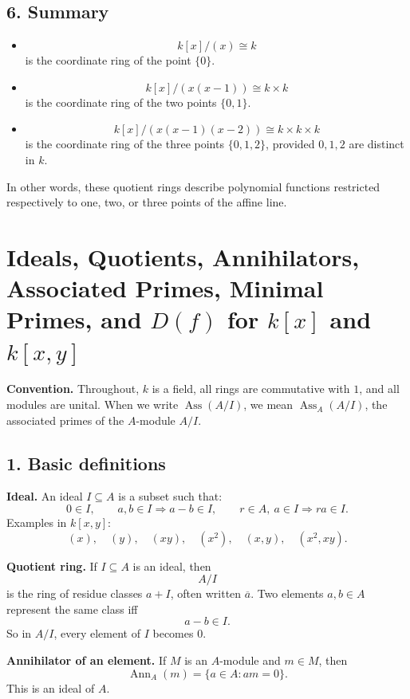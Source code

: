 \documentclass[12pt,a4paper]{article}
\theoremstyle{notespace}
\DeclareMathOperator{\Ass}{Ass}
\DeclareMathOperator{\Ann}{Ann}
\begin{document}
\subsection{6. Summary}

\begin{itemize}
	\item
	\[
	k[x]/(x)\cong k
	\]
	is the coordinate ring of the point \(\{0\}\).
	
	\item
	\[
	k[x]/(x(x-1))\cong k\times k
	\]
	is the coordinate ring of the two points \(\{0,1\}\).
	
	\item
	\[
	k[x]/(x(x-1)(x-2))\cong k\times k\times k
	\]
	is the coordinate ring of the three points \(\{0,1,2\}\), provided \(0,1,2\) are distinct in \(k\).
\end{itemize}

In other words, these quotient rings describe polynomial functions restricted respectively to one, two, or three points of the affine line.

\section{Ideals, Quotients, Annihilators, Associated Primes, Minimal Primes, and \(D(f)\) for \(k[x]\) and \(k[x,y]\)}

\textbf{Convention.}
Throughout, \(k\) is a field, all rings are commutative with \(1\), and all modules are unital.
When we write \(\Ass(A/I)\), we mean \(\Ass_A(A/I)\), the associated primes of the \(A\)-module \(A/I\).

\subsection{1. Basic definitions}

\textbf{Ideal.}
An ideal \(I\subseteq A\) is a subset such that:
\[
0\in I,\qquad a,b\in I \Rightarrow a-b\in I,\qquad r\in A,\ a\in I \Rightarrow ra\in I.
\]
Examples in \(k[x,y]\):
\[
(x),\quad (y),\quad (xy),\quad (x^2),\quad (x,y),\quad (x^2,xy).
\]

\textbf{Quotient ring.}
If \(I\subseteq A\) is an ideal, then
\[
A/I
\]
is the ring of residue classes \(a+I\), often written \(\overline a\).
Two elements \(a,b\in A\) represent the same class iff
\[
a-b\in I.
\]
So in \(A/I\), every element of \(I\) becomes \(0\).

\textbf{Annihilator of an element.}
If \(M\) is an \(A\)-module and \(m\in M\), then
\[
\Ann_A(m)=\{a\in A:am=0\}.
\]
This is an ideal of \(A\).
\end{document}
